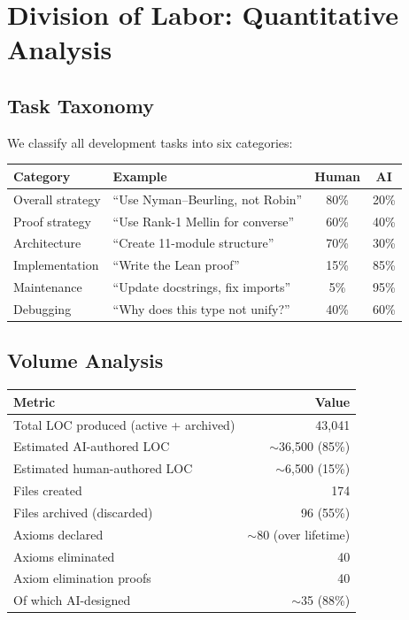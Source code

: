 \documentclass[11pt,a4paper]{article}
\begin{document}
\section{Division of Labor: Quantitative Analysis}
\label{sec:division}

\subsection{Task Taxonomy}

We classify all development tasks into six categories:

\begin{center}
\begin{tabular}{@{}llcc@{}}
\toprule
\textbf{Category} & \textbf{Example} & \textbf{Human} & \textbf{AI} \\
\midrule
Overall strategy & ``Use Nyman--Beurling, not Robin'' & 80\% & 20\% \\
Proof strategy & ``Use Rank-1 Mellin for converse'' & 60\% & 40\% \\
Architecture & ``Create 11-module structure'' & 70\% & 30\% \\
Implementation & ``Write the Lean proof'' & 15\% & 85\% \\
Maintenance & ``Update docstrings, fix imports'' & 5\% & 95\% \\
Debugging & ``Why does this type not unify?'' & 40\% & 60\% \\
\bottomrule
\end{tabular}
\end{center}

\subsection{Volume Analysis}

\begin{center}
\begin{tabular}{@{}lr@{}}
\toprule
\textbf{Metric} & \textbf{Value} \\
\midrule
Total LOC produced (active + archived) & 43,041 \\
Estimated AI-authored LOC & $\sim$36,500 (85\%) \\
Estimated human-authored LOC & $\sim$6,500 (15\%) \\
Files created & 174 \\
Files archived (discarded) & 96 (55\%) \\
Axioms declared & $\sim$80 (over lifetime) \\
Axioms eliminated & 40 \\
Axiom elimination proofs & 40 \\
Of which AI-designed & $\sim$35 (88\%) \\
\bottomrule
\end{tabular}
\end{center}
\end{document}
